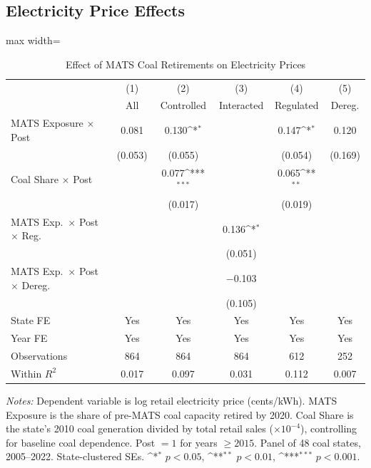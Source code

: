 \documentclass[12pt]{article}
\newcommand{\sym}[1]{\ifmmode^{#1}\else\(^{#1}\)\fi}
\begin{document}
\subsection{Electricity Price Effects}

\begin{table}[H]
\centering
\caption{Effect of MATS Coal Retirements on Electricity Prices}
\begin{threeparttable}
\begin{adjustbox}{max width=\textwidth}
\begin{tabular}{lccccc}
\toprule
& (1) & (2) & (3) & (4) & (5) \\
& All & Controlled & Interacted & Regulated & Dereg. \\
\midrule
MATS Exposure $\times$ Post & 0.081 & 0.130\sym{*} & & 0.147\sym{*} & 0.120 \\
& (0.053) & (0.055) & & (0.054) & (0.169) \\
Coal Share $\times$ Post & & 0.077\sym{***} & & 0.065\sym{**} & \\
& & (0.017) & & (0.019) & \\
MATS Exp.\ $\times$ Post $\times$ Reg. & & & 0.136\sym{*} & & \\
& & & (0.051) & & \\
MATS Exp.\ $\times$ Post $\times$ Dereg. & & & $-$0.103 & & \\
& & & (0.105) & & \\
\addlinespace
State FE & Yes & Yes & Yes & Yes & Yes \\
Year FE & Yes & Yes & Yes & Yes & Yes \\
Observations & 864 & 864 & 864 & 612 & 252 \\
Within $R^2$ & 0.017 & 0.097 & 0.031 & 0.112 & 0.007 \\
\bottomrule
\end{tabular}
\end{adjustbox}
\begin{tablenotes}[flushleft]
\small
\item \textit{Notes:} Dependent variable is log retail electricity price (cents/kWh). MATS Exposure is the share of pre-MATS coal capacity retired by 2020. Coal Share is the state's 2010 coal generation divided by total retail sales ($\times 10^{-4}$), controlling for baseline coal dependence. Post $= 1$ for years $\geq 2015$. Panel of 48 coal states, 2005--2022. State-clustered SEs. \sym{*} $p<0.05$, \sym{**} $p<0.01$, \sym{***} $p<0.001$.
\end{tablenotes}
\end{threeparttable}
\label{tab:main_did}
\end{table}
\end{document}
